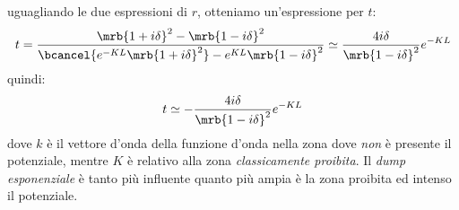 uguagliando le due espressioni di $r$, otteniamo un'espressione per $t$:
\[
  t = \frac{\mrb{1 + i \delta}^{2} - \mrb{1 - i \delta}^{2}}{\bcancel{e^{-KL}
  \mrb{1 + i \delta}^{2}} - e^{KL} \mrb{1 - i \delta}^{2}} \simeq \frac{4 i
  \delta}{\mrb{1 - i \delta}^{2}} e^{-KL}
\]
quindi:
\[
  t \simeq - \frac{4 i \delta}{\mrb{1 - i \delta}^{2}} e^{-KL}
\]
dove $k$ è il vettore d'onda della funzione d'onda nella zona dove \textit{non}
è presente il potenziale, mentre $K$ è relativo alla zona \textit{classicamente
proibita}. Il \textit{dump esponenziale} è tanto più influente quanto più ampia
è la zona proibita ed intenso il potenziale.
